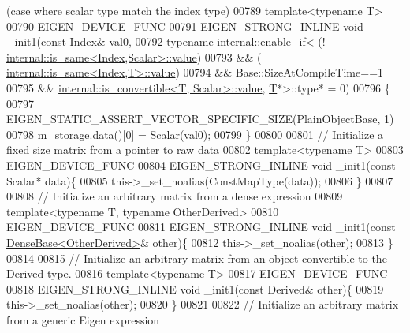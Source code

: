 \begin{DoxyCode}
{       (case where scalar type match the index type)}
00789     \textcolor{keyword}{template}<\textcolor{keyword}{typename} T>
00790     EIGEN\_DEVICE\_FUNC
00791     EIGEN\_STRONG\_INLINE \textcolor{keywordtype}{void} \_init1(\textcolor{keyword}{const} \hyperlink{namespace_eigen_a62e77e0933482dafde8fe197d9a2cfde}{Index}& val0,
00792                                     \textcolor{keyword}{typename} \hyperlink{struct_eigen_1_1internal_1_1enable__if}{internal::enable\_if}<    (!
      \hyperlink{struct_eigen_1_1internal_1_1is__same}{internal::is\_same<Index,Scalar>::value})
00793                                                                   && (
      \hyperlink{struct_eigen_1_1internal_1_1is__same}{internal::is\_same<Index,T>::value})
00794                                                                   && Base::SizeAtCompileTime==1
00795                                                                   && 
      \hyperlink{struct_eigen_1_1internal_1_1is__convertible}{internal::is\_convertible<T, Scalar>::value},
      \hyperlink{group___sparse_core___module}{T}*>::type* = 0)
00796     \{
00797       EIGEN\_STATIC\_ASSERT\_VECTOR\_SPECIFIC\_SIZE(PlainObjectBase, 1)
00798       m\_storage.data()[0] = Scalar(val0);
00799     \}
00800 
00801     \textcolor{comment}{// Initialize a fixed size matrix from a pointer to raw data}
00802     \textcolor{keyword}{template}<\textcolor{keyword}{typename} T>
00803     EIGEN\_DEVICE\_FUNC
00804     EIGEN\_STRONG\_INLINE \textcolor{keywordtype}{void} \_init1(\textcolor{keyword}{const} Scalar* data)\{
00805       this->\_set\_noalias(ConstMapType(data));
00806     \}
00807 
00808     \textcolor{comment}{// Initialize an arbitrary matrix from a dense expression}
00809     \textcolor{keyword}{template}<\textcolor{keyword}{typename} T, \textcolor{keyword}{typename} OtherDerived>
00810     EIGEN\_DEVICE\_FUNC
00811     EIGEN\_STRONG\_INLINE \textcolor{keywordtype}{void} \_init1(\textcolor{keyword}{const} \hyperlink{group___core___module_class_eigen_1_1_dense_base}{DenseBase<OtherDerived>}& other)\{
00812       this->\_set\_noalias(other);
00813     \}
00814 
00815     \textcolor{comment}{// Initialize an arbitrary matrix from an object convertible to the Derived type.}
00816     \textcolor{keyword}{template}<\textcolor{keyword}{typename} T>
00817     EIGEN\_DEVICE\_FUNC
00818     EIGEN\_STRONG\_INLINE \textcolor{keywordtype}{void} \_init1(\textcolor{keyword}{const} Derived& other)\{
00819       this->\_set\_noalias(other);
00820     \}
00821 
00822     \textcolor{comment}{// Initialize an arbitrary matrix from a generic Eigen expression}

\end{DoxyCode}
